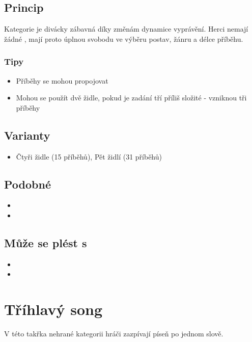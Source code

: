 \documentclass[main.tex]{subfiles}
\begin{document}
\subsection{Princip}  
Kategorie je divácky zábavná díky změnám dynamice vyprávění. Herci nemají žádné , mají proto úplnou svobodu ve výběru postav, žánru a délce příběhu. 
 
\subsubsection{Tipy}  
\begin{itemize}
\item  Příběhy se mohou propojovat
\item  Mohou se použít dvě židle, pokud je zadání tří příliš složité - vzniknou tři příběhy
\end{itemize}
 
\subsection{Varianty} \begin{itemize}
\item  Čtyři židle (15 příběhů), Pět židlí (31 příběhů)
\end{itemize}
 
\subsection{Podobné}  
\begin{itemize}
\item  {}
\item  {}
\end{itemize}
 
\subsection{ Může se plést s } \begin{itemize}
\item  {}
\item  {}
\end{itemize}
 
 
 
 
 
 
 
\needspace{5cm} \section{Tříhlavý song} \label{tříhlavý song}  
V této takřka nehrané kategorii hráči zazpívají píseň po jednom slově. 
\end{document}
